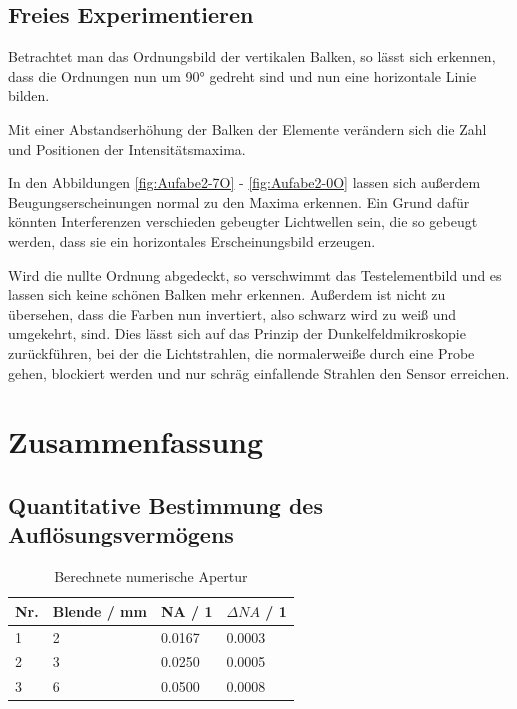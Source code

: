 \documentclass[12pt,a4paper,twoside]{article}
\begin{document}
\subsection{Freies Experimentieren}

Betrachtet man das Ordnungsbild der vertikalen Balken, so lässt sich erkennen, dass die Ordnungen nun um 90° gedreht sind und nun eine horizontale Linie bilden. \newline

\noindent
Mit einer Abstandserhöhung der Balken der Elemente verändern sich die Zahl und Positionen der Intensitätsmaxima. \newline

\noindent
In den Abbildungen \ref{fig:Aufabe2-7O} - \ref{fig:Aufabe2-0O} lassen sich außerdem Beugungserscheinungen normal zu den Maxima erkennen. 
Ein Grund dafür könnten Interferenzen verschieden gebeugter Lichtwellen sein, die so gebeugt werden, dass sie ein horizontales Erscheinungsbild erzeugen.

\noindent
Wird die nullte Ordnung abgedeckt, so verschwimmt das Testelementbild und es lassen sich keine schönen Balken mehr erkennen.
Außerdem ist nicht zu übersehen, dass die Farben nun invertiert, also schwarz wird zu weiß und umgekehrt, sind.
Dies lässt sich auf das Prinzip der Dunkelfeldmikroskopie zurückführen, bei der die Lichtstrahlen, die normalerweiße durch eine Probe gehen, blockiert werden und nur schräg einfallende Strahlen den Sensor erreichen. \cite{dunkelfeldmikroskopie}



\section{Zusammenfassung} %

\subsection{Quantitative Bestimmung des Auflösungsvermögens}

\begin{table}[H]
    \centering
    \caption{Berechnete numerische Apertur}
    \label{tab:BerechneteNA}
    \begin{tabular}{| l | l | l | l |}
        \hline
        Nr. & Blende / mm & NA / 1 & $\Delta NA$ / 1 \\
        \hline
        1 & 2 & 0.0167 & 0.0003 \\
        2 & 3 & 0.0250 & 0.0005 \\
        3 & 6 & 0.0500 & 0.0008 \\
        \hline
    \end{tabular}
\end{table}
\end{document}
